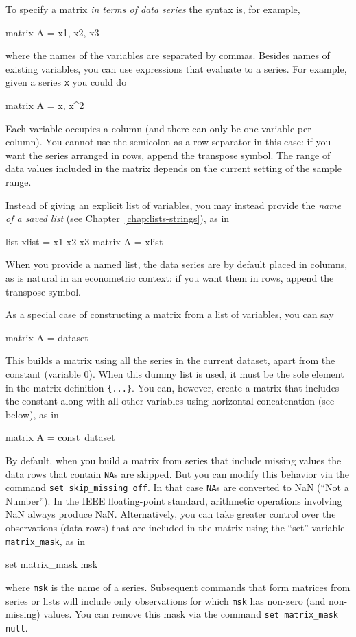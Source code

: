 To specify a matrix \textit{in terms of data series} the syntax is,
for example,
%
\begin{code}
matrix A = {x1, x2, x3}
\end{code}
%
where the names of the variables are separated by commas.  Besides
names of existing variables, you can use expressions that evaluate to
a series.  For example, given a series \texttt{x} you could do
%
\begin{code}
matrix A = {x, x^2}
\end{code}
%
Each variable occupies a column (and there can only be one variable
per column).  You cannot use the semicolon as a row separator in this
case: if you want the series arranged in rows, append the transpose
symbol.  The range of data values included in the matrix depends on
the current setting of the sample range.

Instead of giving an explicit list of variables, you may instead
provide the \textit{name of a saved list} (see
Chapter~\ref{chap:lists-strings}), as in
%
\begin{code}
list xlist = x1 x2 x3
matrix A = {xlist}
\end{code}
%
When you provide a named list, the data series are by default placed
in columns, as is natural in an econometric context: if you want them
in rows, append the transpose symbol.

As a special case of constructing a matrix from a list of variables,
you can say
%
\begin{code}
matrix A = {dataset}
\end{code}
%
This builds a matrix using all the series in the current dataset,
apart from the constant (variable 0).  When this dummy list is used, it
must be the sole element in the matrix definition \texttt{\{...\}}.  You
can, however, create a matrix that includes the constant along with
all other variables using horizontal concatenation (see below), as in
%
\begin{code}
matrix A = {const}~{dataset}
\end{code}
%

By default, when you build a matrix from series that include missing
values the data rows that contain \texttt{NA}s are skipped.  But you
can modify this behavior via the command \texttt{set skip\_missing
  off}.  In that case \texttt{NA}s are converted to NaN (``Not a
Number'').  In the IEEE floating-point standard, arithmetic operations
involving NaN always produce NaN. Alternatively, you can take greater
control over the observations (data rows) that are included in 
the matrix using the ``set'' variable \texttt{matrix\_mask}, as in
%
\begin{code}
set matrix_mask msk
\end{code}
%
where \texttt{msk} is the name of a series.  Subsequent commands that
form matrices from series or lists will include only observations
for which \texttt{msk} has non-zero (and non-missing) values. You
can remove this mask via the command \texttt{set matrix\_mask null}.

